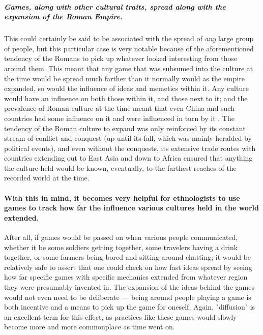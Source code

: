 \subparagraph{Games, along with other cultural traits, spread along with the expansion of the Roman Empire.}
This could certainly be said to be associated with the spread of \emph{any} large group of people, but this particular case is very notable because of the aforementioned tendency of the Romans to pick up
whatever looked interesting from those around them.
This meant that any game that was subsumed into the culture at the time would be spread much farther than it normally would as the empire expanded, so would the influence of ideas and memetics within it.
Any culture would have an influence on both those within it, and those next to it;
and the prevalence of Roman culture at the time meant that even China and such countries had some influence on it and were influenced in turn by it \citep{armesto2010}.
The tendency of the Roman culture to expand was only reinforced by its constant stream of conflict and conquest (up until its fall, which was mainly heralded by political events),
and even without the conquests, its extensive trade routes with countries extending out to East Asia and down to Africa ensured that anything the culture held would be known, eventually, to the farthest reaches
of the recorded world at the time.

\paragraph{With this in mind, it becomes very helpful for ethnologists to use games to track how far the influence various cultures held in the world extended.}
After all, if games would be passed on when various people communicated, whether it be some soldiers getting together, some travelers having a drink together, or some farmers being bored and sitting around chatting;
it would be relatively safe to assert that one could check on how fast ideas spread by seeing how far specific games with specific mechanics extended from whatever region they were presumably invented in.
The expansion of the ideas behind the games would not even need to be deliberate --- being around people playing a game is both incentive and a means to pick up the game for oneself.
Again, "diffusion" is an excellent term for this effect, as practices like these games would slowly become more and more commonplace as time went on.

